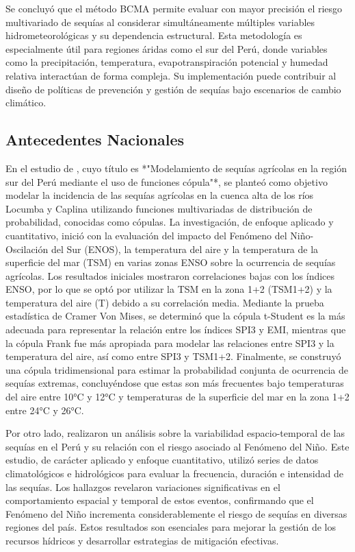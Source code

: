 Se concluyó que el método BCMA permite evaluar con mayor precisión el riesgo multivariado de sequías al considerar simultáneamente múltiples variables hidrometeorológicas y su dependencia estructural. Esta metodología es especialmente útil para regiones áridas como el sur del Perú, donde variables como la precipitación, temperatura, evapotranspiración potencial y humedad relativa interactúan de forma compleja. Su implementación puede contribuir al diseño de políticas de prevención y gestión de sequías bajo escenarios de cambio climático.

\subsection{Antecedentes Nacionales}

En el estudio de \textcite{Cabrera2023}, cuyo título es *"Modelamiento de sequías agrícolas en la región sur del Perú mediante el uso de funciones cópula"*, se planteó como objetivo modelar la incidencia de las sequías agrícolas en la cuenca alta de los ríos Locumba y Caplina utilizando funciones multivariadas de distribución de probabilidad, conocidas como cópulas. La investigación, de enfoque aplicado y cuantitativo, inició con la evaluación del impacto del Fenómeno del Niño-Oscilación del Sur (ENOS), la temperatura del aire y la temperatura de la superficie del mar (TSM) en varias zonas ENSO sobre la ocurrencia de sequías agrícolas. Los resultados iniciales mostraron correlaciones bajas con los índices ENSO, por lo que se optó por utilizar la TSM en la zona 1+2 (TSM1+2) y la temperatura del aire (T) debido a su correlación media. Mediante la prueba estadística de Cramer Von Mises, se determinó que la cópula t-Student es la más adecuada para representar la relación entre los índices SPI3 y EMI, mientras que la cópula Frank fue más apropiada para modelar las relaciones entre SPI3 y la temperatura del aire, así como entre SPI3 y TSM1+2. Finalmente, se construyó una cópula tridimensional para estimar la probabilidad conjunta de ocurrencia de sequías extremas, concluyéndose que estas son más frecuentes bajo temperaturas del aire entre 10°C y 12°C y temperaturas de la superficie del mar en la zona 1+2 entre 24°C y 26°C.

Por otro lado, \textcite{Cabrera2021} realizaron un análisis sobre la variabilidad espacio-temporal de las sequías en el Perú y su relación con el riesgo asociado al Fenómeno del Niño. Este estudio, de carácter aplicado y enfoque cuantitativo, utilizó series de datos climatológicos e hidrológicos para evaluar la frecuencia, duración e intensidad de las sequías. Los hallazgos revelaron variaciones significativas en el comportamiento espacial y temporal de estos eventos, confirmando que el Fenómeno del Niño incrementa considerablemente el riesgo de sequías en diversas regiones del país. Estos resultados son esenciales para mejorar la gestión de los recursos hídricos y desarrollar estrategias de mitigación efectivas.

